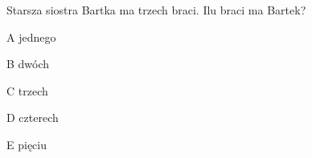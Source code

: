 \begin{tresc}
Starsza siostra Bartka ma trzech braci. Ilu braci ma Bartek?
\end{tresc}
\begin{wariant}{A} jednego \end{wariant}
\begin{wariant}{B} dwóch \end{wariant}
\begin{wariant}{C} trzech \end{wariant}
\begin{wariant}{D} czterech \end{wariant}
\begin{wariant}{E} pięciu \end{wariant}
